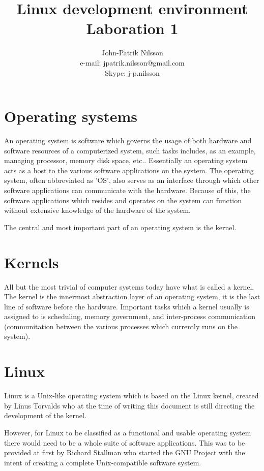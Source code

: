 \documentclass[a4paper,10pt]{article}
\title{Linux development environment \\
	Laboration 1}
\author{John-Patrik Nilsson \\
	e-mail: jpatrik.nilsson@gmail.com \\
	Skype: j-p.nilsson}
\begin{document}
\maketitle

\pagestyle{empty}
\thispagestyle{empty}

\section{Operating systems}
An operating system is software which governs the usage of both hardware and software resources of a computerized system, such tasks includes, as an example, managing processor, memory disk space, etc.. Essentially an operating system acts as a host to the various software applications on the system. The operating system, often abbreviated as 'OS', also serves as an interface through which other software applications can communicate with the hardware. Because of this, the software applications which resides and operates on the system can function without extensive knowledge of the hardware of the system. 

The central and most important part of an operating system is the kernel.

\section{Kernels}
All but the most trivial of computer systems today have what is called a kernel. The kernel is the innermost abstraction layer of an operating system, it is the last line of software before the hardware. Important tasks which a kernel usually is assigned to is scheduling, memory government, and inter-process communication (communitation between the various processes which currently runs on the system).

\section{Linux}
Linux is a Unix-like operating system which is based on the Linux kernel, created by Linus Torvalds who at the time of writing this document is still directing the development of the kernel.

However, for Linux to be classified as a functional and usable operating system there would need to be a whole suite of software applications. This was to be provided at first by Richard Stallman who started the GNU Project with the intent of creating a complete Unix-compatible software system.
\end{document}
